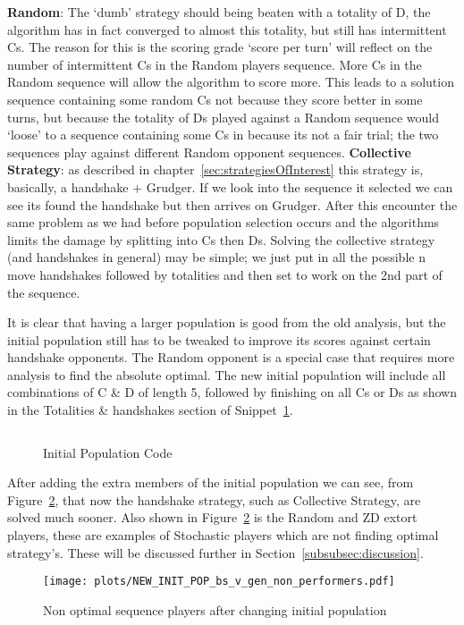 \textbf{Random}: The `dumb' strategy should being beaten with a totality of D, the algorithm has in fact converged to almost this totality, but still has intermittent Cs.
The reason for this is the scoring grade `score per turn' will reflect on the number of intermittent Cs in the Random players sequence.
More Cs in the Random sequence will allow the algorithm to score more.
This leads to a solution sequence containing some random Cs not because they score better in some turns, but because the totality of Ds played against
a Random sequence would `loose' to a sequence containing some Cs in because its not a fair trial; the two sequences play against different Random opponent sequences.
\textbf{Collective Strategy}: as described in chapter~\ref{sec:strategiesOfInterest} this strategy is, basically, a handshake + Grudger.
If we look into the sequence it selected we can see its found the handshake but then arrives on Grudger.
After this encounter the same problem as we had before population selection occurs and the algorithms limits the damage by splitting into Cs then Ds. Solving the collective strategy (and handshakes in general) may be simple;
we just put in all the possible n move handshakes followed by totalities and then set to work on the 2nd part of the sequence.

It is clear that having a larger population is good from the old analysis, but the initial population still has to be tweaked to improve its scores against certain handshake opponents.
The Random opponent is a special case that requires more analysis to find the absolute optimal.
The new initial population will include all combinations of C \& D of length 5, followed by finishing on all Cs or Ds as shown in the Totalities \& handshakes section of Snippet~\ref{code:initialPopulationCode}.

\begin{figure}
    \inputminted{python}{code_snippets/initialPopulationCode.py}
    \caption{Initial Population Code}\label{code:initialPopulationCode}
\end{figure}

After adding the extra members of the initial population we can see, from Figure~\ref{fig:NEW-INIT-POP-bs-v-gen-non-performers}, that now the handshake strategy, such as Collective Strategy, are solved much sooner.
Also shown in Figure~\ref{fig:NEW-INIT-POP-bs-v-gen-non-performers} is the Random and ZD extort players, these are examples of Stochastic players which are not finding optimal strategy's.
These will be discussed further in Section~\ref{subsubsec:discussion}.
\begin{figure}[h]
    \texttt{[image: plots/NEW\_INIT\_POP\_bs\_v\_gen\_non\_performers.pdf]}
    \caption{Non optimal sequence players after changing initial population}\label{fig:NEW-INIT-POP-bs-v-gen-non-performers}
\end{figure}

